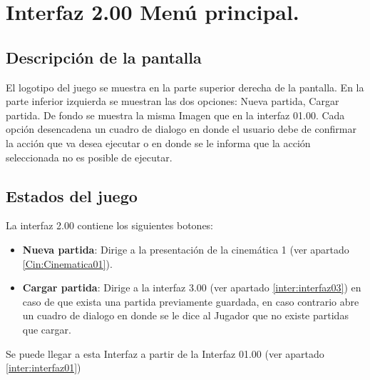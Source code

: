 \section{Interfaz 2.00 Menú principal.} \label{inter:interfaz02}
	\subsection{Descripción de la pantalla}
El logotipo del juego se muestra en la parte superior derecha de la pantalla. En la parte inferior izquierda se muestran las dos opciones: Nueva partida, Cargar partida. De fondo se muestra la misma Imagen que en la interfaz 01.00. 
Cada opción desencadena un cuadro de dialogo en donde el usuario debe de confirmar la acción que va desea ejecutar o en donde se le informa que la acción seleccionada no es posible de ejecutar.
	\subsection{Estados del juego}
La interfaz 2.00 contiene los siguientes botones:
\begin{itemize}
	\item \textbf{Nueva partida}:  Dirige a la presentación de la cinemática 1 (ver apartado \ref{Cin:Cinematica01}).
	\item \textbf{Cargar partida}: Dirige a la interfaz 3.00 (ver apartado \ref{inter:interfaz03}) en caso de que exista una partida previamente guardada, en caso contrario abre un cuadro de dialogo en donde se le dice al Jugador que no existe partidas que cargar.
\end{itemize}
Se puede llegar a esta Interfaz a partir de la Interfaz 01.00 (ver apartado \ref{inter:interfaz01})
